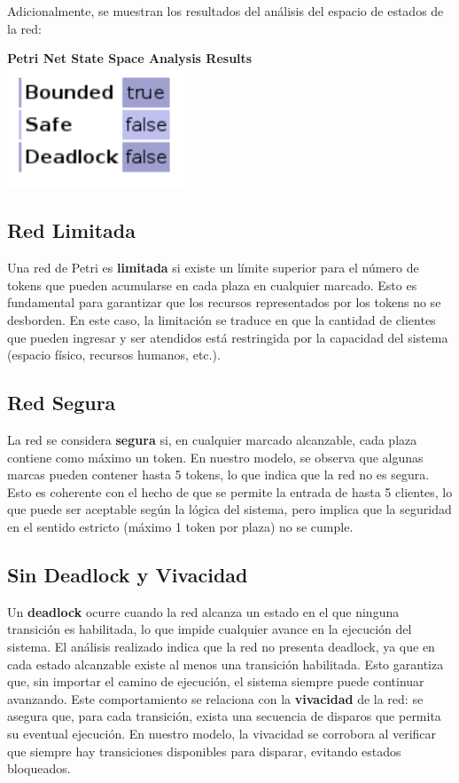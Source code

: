 \documentclass[12pt]{article}
\begin{document}
\bigskip

Adicionalmente, se muestran los resultados del análisis del espacio de estados de la red:

\begin{center}
    \textbf{Petri Net State Space Analysis Results}\\[0.5em]
    \includegraphics[width=0.4\textwidth]{Petri-Net-State.png}
\end{center}

\subsection{Red Limitada}
Una red de Petri es \textbf{limitada} si existe un límite superior para el número de tokens que pueden acumularse en cada plaza en cualquier marcado. Esto es fundamental para garantizar que los recursos representados por los tokens no se desborden.  
En este caso, la limitación se traduce en que la cantidad de clientes que pueden ingresar y ser atendidos está restringida por la capacidad del sistema (espacio físico, recursos humanos, etc.).

\subsection{Red Segura}
La red se considera \textbf{segura} si, en cualquier marcado alcanzable, cada plaza contiene como máximo un token.  
En nuestro modelo, se observa que algunas marcas pueden contener hasta 5 tokens, lo que indica que la red no es segura. Esto es coherente con el hecho de que se permite la entrada de hasta 5 clientes, lo que puede ser aceptable según la lógica del sistema, pero implica que la seguridad en el sentido estricto (máximo 1 token por plaza) no se cumple.

\subsection{Sin Deadlock y Vivacidad}
Un \textbf{deadlock} ocurre cuando la red alcanza un estado en el que ninguna transición es habilitada, lo que impide cualquier avance en la ejecución del sistema.  
El análisis realizado indica que la red no presenta deadlock, ya que en cada estado alcanzable existe al menos una transición habilitada. Esto garantiza que, sin importar el camino de ejecución, el sistema siempre puede continuar avanzando.  
Este comportamiento se relaciona con la \textbf{vivacidad} de la red: se asegura que, para cada transición, exista una secuencia de disparos que permita su eventual ejecución. En nuestro modelo, la vivacidad se corrobora al verificar que siempre hay transiciones disponibles para disparar, evitando estados bloqueados.
\end{document}
